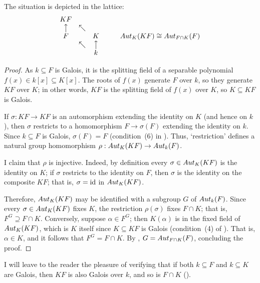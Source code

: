 The situation is depicted in the lattice:
\[
  \begin{array}{ccc}
    KF & & \\
    \big\uparrow & \nwarrow & \\
    F & & K \\
       & \nwarrow & \big\uparrow \\
       & & k
  \end{array}
  \qquad
  \begin{array}{c}
    Aut_K(KF) \cong Aut_{F \cap K}(F)
  \end{array}
\]
\begin{proof}
  As $k \subseteq F$ is Galois, it is the splitting field of a
  separable polynomial $f(x) \in k[x] \subseteq K[x]$. The roots of
  $f(x)$ generate $F$ over $k$, so they generate $KF$ over $K$; in
  other words, $KF$ is the splitting field of $f(x)$ over $K$, so
  $K \subseteq KF$ is Galois.

  If $\sigma : KF \to KF$ is an automorphism extending the identity on
  $K$ (and hence on $k$), then $\sigma$ restricts to a homomorphism
  $F \to \sigma(F)$ extending the identity on $k$. Since
  $k \subseteq F$ is Galois, $\sigma(F) = F$ (condition~(6) in
  ). Thus, `restriction' defines a natural group
  homomorphism $\rho : Aut_K(KF) \to Aut_k(F)$.

  I claim that $\rho$ is injective. Indeed, by definition every
  $\sigma \in Aut_K(KF)$ is the identity on $K$; if $\sigma$
  restricts to the identity on $F$, then $\sigma$ is the identity on
  the composite $KF$; that is, $\sigma = \operatorname{id}$ in $Aut_K(KF)$.

  Therefore, $Aut_K(KF)$ may be identified with a subgroup $G$ of
  $Aut_k(F)$. Since every $\sigma \in Aut_K(KF)$ fixes $K$, the
  restriction $\rho(\sigma)$ fixes $F \cap K$; that is,
  $F^G \supseteq F \cap K$. Conversely, suppose $\alpha \in F^G$; then
  $K(\alpha)$ is in the fixed field of $Aut_K(KF)$, which is $K$
  itself since $K \subseteq KF$ is Galois (condition~(4) of
  ). That is, $\alpha \in K$, and it follows that
  $F^G = F \cap K$. By ,
  $G = Aut_{F \cap K}(F)$, concluding the proof.
\end{proof}
I will leave to the reader the pleasure of verifying that if both
$k \subseteq F$ and $k \subseteq K$ are Galois, then $KF$ is also
Galois over $k$, and so is $F \cap K$
().
